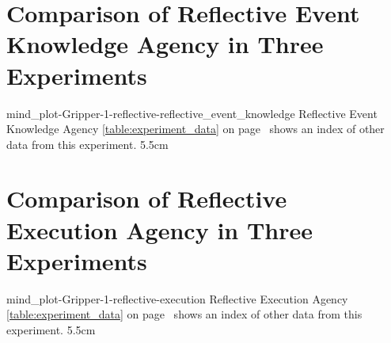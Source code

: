 {\clearpage
  \section{Comparison of Reflective Event Knowledge Agency in Three Experiments}
  \experimentcausegroupplots{\dataappendixmaxtime}
                            {\dataappendixexperimentonemaxtime}
                            {\dataappendixexperimenttwomaxtime}
                            {\dataappendixexperimentthreemaxtime}
                            {\dataappendixexperimentonename}
                            {\dataappendixexperimenttwoname}
                            {\dataappendixexperimentthreename}
                            {\dataappendixexperimentoneprettyname}
                            {\dataappendixexperimenttwoprettyname}
                            \experimentcausegroupplotscontinued{\dataappendixexperimentthreeprettyname}
                                                               {mind_plot-Gripper-1-reflective-reflective_event_knowledge}
                                                               {Reflective Event Knowledge Agency}
                                                               {  {\mbox{\autoref{table:experiment_data}}} on
                                                                 {\mbox{page~\pageref{table:experiment_data}}} shows an index of other data
                                                                 from this experiment.}
                                                               {5.5cm}
}
{\clearpage
  \section{Comparison of Reflective Execution Agency in Three Experiments}
  \experimentcausegroupplots{\dataappendixmaxtime}
                            {\dataappendixexperimentonemaxtime}
                            {\dataappendixexperimenttwomaxtime}
                            {\dataappendixexperimentthreemaxtime}
                            {\dataappendixexperimentonename}
                            {\dataappendixexperimenttwoname}
                            {\dataappendixexperimentthreename}
                            {\dataappendixexperimentoneprettyname}
                            {\dataappendixexperimenttwoprettyname}
                            \experimentcausegroupplotscontinued{\dataappendixexperimentthreeprettyname}
                                                               {mind_plot-Gripper-1-reflective-execution}
                                                               {Reflective Execution Agency}
                                                               {  {\mbox{\autoref{table:experiment_data}}} on
                                                                 {\mbox{page~\pageref{table:experiment_data}}} shows an index of other data
                                                                 from this experiment.}
                                                               {5.5cm}
}
